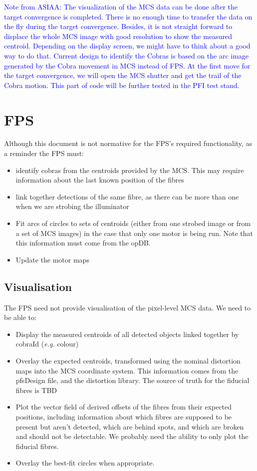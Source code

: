 \documentclass[12pt]{article}
\newcommand{\eg}{\textit{e.g.}\xspace}
\newcommand{\MCS}{\gls{MCS}\xspace}
\newcommand{\FPS}{\gls{FPS}\xspace}
\newcommand{\opDB}{\gls{opDB}\xspace}
\newcommand{\TBD}{\gls{TBD}\xspace}
\begin{document}
\textcolor{blue}{
Note from ASIAA: The visualization of the MCS data can be done after the target
convergence is completed. There is no enough time to transfer the data
on the fly during the target convergence. Besides, it is not straight
forward to displace the whole MCS image with good resolution to show
the measured centroid. Depending on the display screen, we might have
to think about a good way to do that.
Current design to identify the Cobras is based on the arc image
generated by the Cobra movement in MCS instead of FPS. At the first
move for the target convergence, we will open the MCS shutter and get
the trail of the Cobra motion. This part of code will be further
tested in the PFI test stand.
}

\section{FPS}

Although this document is not normative for the \FPS's required functionality, as a reminder
the \FPS must:
\begin{itemize}
\item
  identify cobras from the centroids provided by the \MCS.  This may
  require information about the last known position of the fibres
\item
  link together detections of the same fibre, as there can be more than
  one when we are strobing the illuminator
\item
  Fit arcs of circles to sets of centroids (either from one strobed image or from
  a set of \MCS images) in the case that only one motor is being run.  Note that
  this information must come from the \opDB.
\item
  Update the \glspl{motor map}
\end{itemize}

\subsection{Visualisation}

The \FPS need not provide visualisation of the pixel-level \MCS data.
We need to be able to:
\begin{itemize}
\item Display the measured centroids of all detected objects linked together by cobraId (\eg colour)  
\item Overlay the expected centroids, transformed using the nominal distortion maps
  into the \MCS coordinate system.
  This information comes from the \gls{pfsDesign} file, and the distortion library. The
  source of truth for the fiducial fibres is \TBD
\item Plot the vector field of derived offsets of the fibres from their expected positions,
  including information about which fibres are supposed to be present but aren't detected,
  which are behind spots, and which are broken and should not be detectable.
  We probably need the ability to only plot the fiducial fibres.
\item
  Overlay the best-fit circles when appropriate.
\end{itemize}
\end{document}
